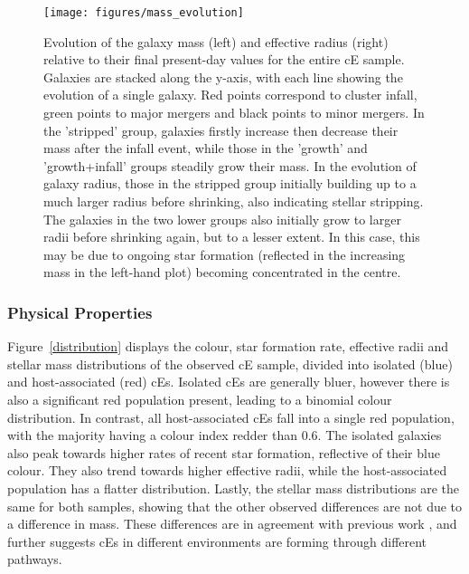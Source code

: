 \documentclass[a4paper,fleqn,usenatbib]{mnras}
\begin{document}
\begin{figure*}
\texttt{[image: figures/mass\_evolution]}
   \caption{Evolution of the galaxy mass (left) and effective radius (right) relative to their final present-day values for the entire cE sample. Galaxies are stacked along the y-axis, with each line showing the evolution of a single galaxy. Red points correspond to cluster infall, green points to major mergers and black points to minor mergers. In the 'stripped' group, galaxies firstly increase then decrease their mass after the infall event, while those in the 'growth' and 'growth+infall' groups steadily grow their mass. In the evolution of galaxy radius, those in the stripped group initially building up to a much larger radius before shrinking, also indicating stellar stripping. The galaxies in the two lower groups also initially grow to larger radii before shrinking again, but to a lesser extent. In this case, this may be due to ongoing star formation (reflected in the increasing mass in the left-hand plot) becoming concentrated in the centre.}
 \label{hist_mass}
 \end{figure*}



\subsubsection{Physical Properties}




Figure~\ref{distribution} displays the colour, star formation rate, effective radii and stellar mass distributions of the observed cE sample, divided into isolated (blue) and host-associated (red) cEs. Isolated cEs are generally bluer, however there is also a significant red population present, leading to a binomial colour distribution. In contrast, all host-associated cEs fall into a single red population, with the majority having a colour index redder than 0.6. The isolated galaxies also peak towards higher rates of recent star formation, reflective of their blue colour. They also trend towards higher effective radii, while the host-associated population has a flatter distribution. Lastly, the stellar mass distributions are the same for both samples, showing that the other observed differences are not due to a difference in mass. These differences are in agreement with previous work \citet{2020ApJ...903...65K}, and further suggests cEs in different environments are forming through different pathways.  
\end{document}
